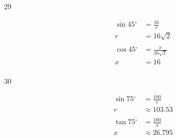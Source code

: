 \documentclass{exam}
\newcommand{\dg}{\ensuremath{^\circ}}
\begin{document}
\begin{description}
  
  
      \item[29]
        \begin{align*}
          \sin 45 \dg & = \frac{16}{r} \\
          r           & = \boxed{ 16 \sqrt{2} } \\
          \\
          \cos 45 \dg & = \frac{x}{16 \sqrt{2}} \\
          x           & = \boxed{ 16 } \\
        \end{align*}

      \item[30]
        \begin{align*}
          \sin 75 \dg & = \frac{100}{r} \\
          r           & \approx \boxed{ 103.53 } \\
          \\
          \tan 75 \dg & = \frac{100}{x} \\
          x           & \approx \boxed{ 26.795 } \\
        \end{align*}


\end{description}
\end{document}
